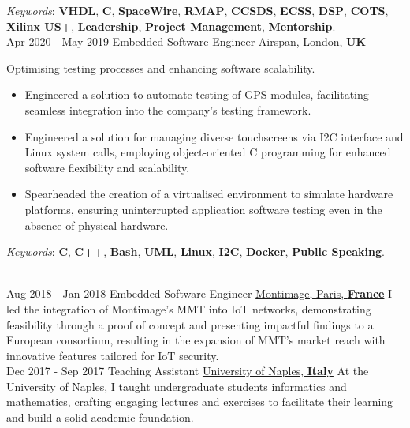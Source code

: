 \documentclass[letterpaper]{twentysecondcv} %
\begin{document}
\begin{twenty}
{            \vspace{1 mm}
            \textit{Keywords}: \textbf{VHDL}, \textbf{C}, \textbf{SpaceWire}, \textbf{RMAP}, \textbf{CCSDS}, \textbf{ECSS}, \textbf{DSP}, \textbf{COTS}, \textbf{Xilinx US+}, \textbf{Leadership}, \textbf{Project Management}, \textbf{Mentorship}.
        }\\
    \twentyitem
    	{Apr 2020 -}
		{May 2019}
        {Embedded Software Engineer}
        {\href{https://www.airspan.com/}{Airspan, London, \textbf{UK}}}
        {}
        {
            Optimising testing processes and enhancing software scalability.
            \vspace{1 mm}
            \begin{itemize}
                \item Engineered a solution to automate testing of GPS modules, facilitating seamless integration into the company's testing framework.
                \item Engineered a solution for managing diverse touchscreens via I2C interface and Linux system calls, employing object-oriented C programming for enhanced software flexibility and scalability.
                \item Spearheaded the creation of a virtualised environment to simulate hardware platforms, ensuring uninterrupted application software testing even in the absence of physical hardware.
            \end{itemize}

            \vspace{1 mm}
            \textit{Keywords}: \textbf{C}, \textbf{C++}, \textbf{Bash}, \textbf{UML}, \textbf{Linux}, \textbf{I2C}, \textbf{Docker}, \textbf{Public Speaking}.
        }\\
    \twentyitem
        {Aug 2018 -}
    	{Jan 2018}
        {Embedded Software Engineer}
        {\href{https://www.montimage.com/}{Montimage, Paris, \textbf{France}}}
        {}
        {
            I led the integration of Montimage's MMT into IoT networks, demonstrating feasibility through a proof of concept and presenting impactful findings to a European consortium, resulting in the expansion of MMT's market reach with innovative features tailored for IoT security.
        }\\
    \twentyitem
        {Dec 2017 -}
  		{Sep 2017}
        {Teaching Assistant}
        {\href{http://www.scuolapsb.unina.it/}{University of Naples, \textbf{Italy}}}
        {}
        {
            At the University of Naples, I taught undergraduate students informatics and mathematics, crafting engaging lectures and exercises to facilitate their learning and build a solid academic foundation.
        }
\end{twenty}
\end{document}
